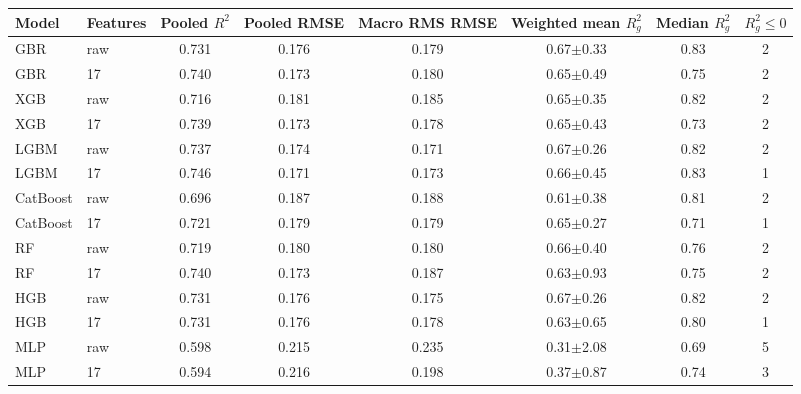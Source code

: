 \begin{tabular}{llcccccc}\toprule Model & Features & Pooled $R^2$ & Pooled RMSE & Macro RMS RMSE & Weighted mean $R^2_g$ & Median $R^2_g$ & $R^2_g\le0$\\\midrule
GBR & raw & 0.731 & 0.176 & 0.179 & 0.67$\pm$0.33 & 0.83 & 2\\
GBR & 17 & 0.740 & 0.173 & 0.180 & 0.65$\pm$0.49 & 0.75 & 2\\
XGB & raw & 0.716 & 0.181 & 0.185 & 0.65$\pm$0.35 & 0.82 & 2\\
XGB & 17 & 0.739 & 0.173 & 0.178 & 0.65$\pm$0.43 & 0.73 & 2\\
LGBM & raw & 0.737 & 0.174 & 0.171 & 0.67$\pm$0.26 & 0.82 & 2\\
LGBM & 17 & 0.746 & 0.171 & 0.173 & 0.66$\pm$0.45 & 0.83 & 1\\
CatBoost & raw & 0.696 & 0.187 & 0.188 & 0.61$\pm$0.38 & 0.81 & 2\\
CatBoost & 17 & 0.721 & 0.179 & 0.179 & 0.65$\pm$0.27 & 0.71 & 1\\
RF & raw & 0.719 & 0.180 & 0.180 & 0.66$\pm$0.40 & 0.76 & 2\\
RF & 17 & 0.740 & 0.173 & 0.187 & 0.63$\pm$0.93 & 0.75 & 2\\
HGB & raw & 0.731 & 0.176 & 0.175 & 0.67$\pm$0.26 & 0.82 & 2\\
HGB & 17 & 0.731 & 0.176 & 0.178 & 0.63$\pm$0.65 & 0.80 & 1\\
MLP & raw & 0.598 & 0.215 & 0.235 & 0.31$\pm$2.08 & 0.69 & 5\\
MLP & 17 & 0.594 & 0.216 & 0.198 & 0.37$\pm$0.87 & 0.74 & 3\\
\bottomrule\end{tabular}